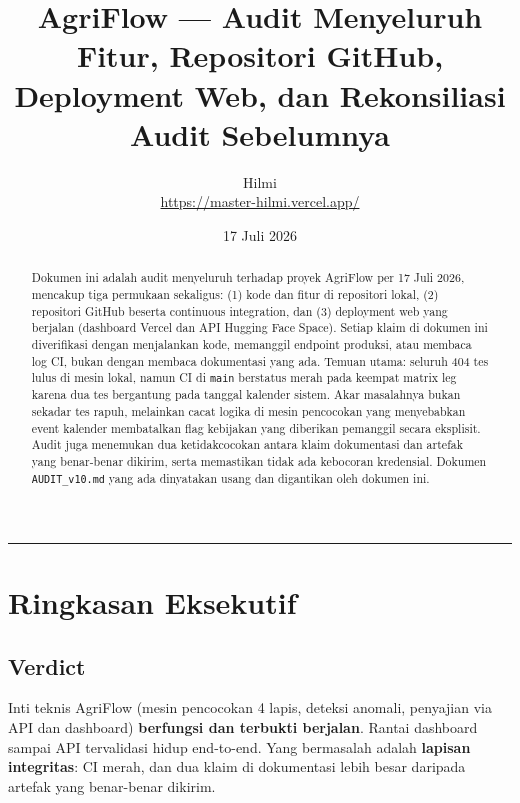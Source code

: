 \documentclass[11pt,a4paper]{article}
\title{\textbf{AgriFlow — Audit Menyeluruh}\\[4pt]
\large Fitur, Repositori GitHub, Deployment Web, dan Rekonsiliasi Audit Sebelumnya}
\author{Hilmi \\ \small\url{https://master-hilmi.vercel.app/}}
\date{17 Juli 2026}
\newcommand{\code}[1]{\texttt{\small #1}}
\begin{document}
\maketitle

\begin{abstract}
\noindent
Dokumen ini adalah audit menyeluruh terhadap proyek AgriFlow per 17 Juli 2026, mencakup tiga
permukaan sekaligus: (1) kode dan fitur di repositori lokal, (2) repositori GitHub beserta
continuous integration, dan (3) deployment web yang berjalan (dashboard Vercel dan API Hugging
Face Space). Setiap klaim di dokumen ini diverifikasi dengan menjalankan kode, memanggil endpoint
produksi, atau membaca log CI, bukan dengan membaca dokumentasi yang ada. Temuan utama: seluruh
404 tes lulus di mesin lokal, namun CI di \code{main} berstatus merah pada keempat matrix leg
karena dua tes bergantung pada tanggal kalender sistem. Akar masalahnya bukan sekadar tes rapuh,
melainkan cacat logika di mesin pencocokan yang menyebabkan event kalender membatalkan flag
kebijakan yang diberikan pemanggil secara eksplisit. Audit juga menemukan dua ketidakcocokan
antara klaim dokumentasi dan artefak yang benar-benar dikirim, serta memastikan tidak ada
kebocoran kredensial. Dokumen \code{AUDIT\_v10.md} yang ada dinyatakan usang dan digantikan oleh
dokumen ini.
\end{abstract}

\tableofcontents
\vspace{1em}
\hrule
\vspace{1em}

\section{Ringkasan Eksekutif}

\subsection{Verdict}

Inti teknis AgriFlow (mesin pencocokan 4 lapis, deteksi anomali, penyajian via API dan dashboard)
\textbf{berfungsi dan terbukti berjalan}. Rantai dashboard sampai API tervalidasi hidup
end-to-end. Yang bermasalah adalah \textbf{lapisan integritas}: CI merah, dan dua klaim di
dokumentasi lebih besar daripada artefak yang benar-benar dikirim.
\end{document}
